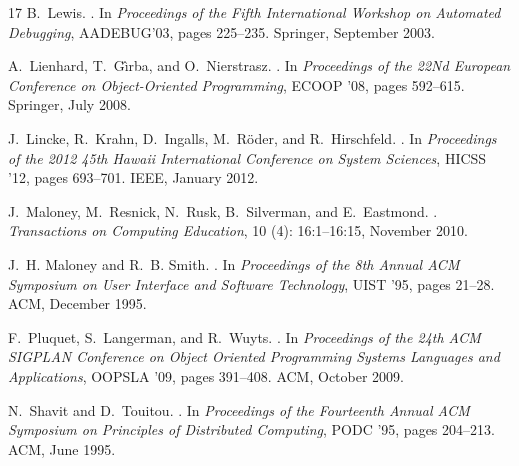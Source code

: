 \documentclass{sigplanconf}
\begin{document}
{\begin{thebibliography}{17}
B.~Lewis.
.
\newblock In \emph{{Proceedings of the Fifth International Workshop on
  Automated Debugging}}, AADEBUG’03, pages 225--235. Springer, September
  2003.

A.~Lienhard, T.~G\^{\i}rba, and O.~Nierstrasz.
.
\newblock In \emph{{Proceedings of the 22Nd European Conference on
  Object-Oriented Programming}}, ECOOP '08, pages 592--615. Springer, July
  2008.

J.~Lincke, R.~Krahn, D.~Ingalls, M.~R\"{o}der, and R.~Hirschfeld.
.
\newblock In \emph{Proceedings of the 2012 45th Hawaii International Conference
  on System Sciences}, HICSS '12, pages 693--701. IEEE, January 2012.

J.~Maloney, M.~Resnick, N.~Rusk, B.~Silverman, and E.~Eastmond.
.
\newblock \emph{Transactions on Computing Education}, 10 (4):
  16:1--16:15, November 2010.

J.~H. Maloney and R.~B. Smith.
.
\newblock In \emph{{Proceedings of the 8th Annual ACM Symposium on User
  Interface and Software Technology}}, UIST '95, pages 21--28. ACM, December
  1995.

F.~Pluquet, S.~Langerman, and R.~Wuyts.
.
\newblock In \emph{Proceedings of the 24th ACM SIGPLAN Conference on Object
  Oriented Programming Systems Languages and Applications}, OOPSLA '09, pages
  391--408. ACM, October 2009.

N.~Shavit and D.~Touitou.
.
\newblock In \emph{{Proceedings of the Fourteenth Annual ACM Symposium on
  Principles of Distributed Computing}}, PODC '95, pages 204--213. ACM, June
  1995.


\end{thebibliography}}
\end{document}
